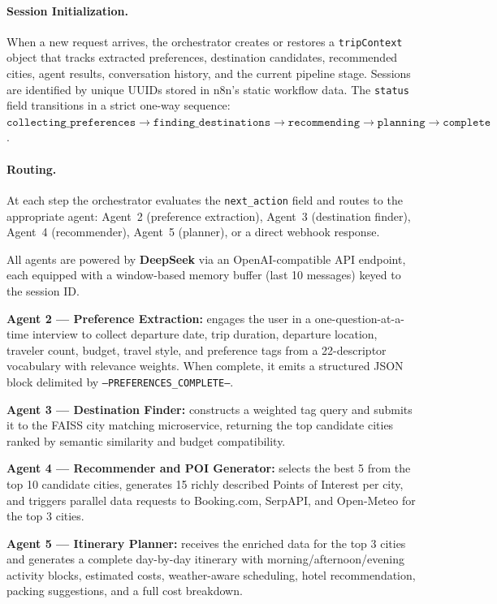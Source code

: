 \documentclass[12pt,a4paper]{report}
\begin{document}
\paragraph{Session Initialization.}
When a new request arrives, the orchestrator creates or restores a \texttt{tripContext} object that
tracks extracted preferences, destination candidates, recommended cities, agent results, conversation
history, and the current pipeline stage. Sessions are identified by unique UUIDs stored in n8n's
static workflow data. The \texttt{status} field transitions in a strict one-way sequence:
$\texttt{collecting\_preferences} \to \texttt{finding\_destinations} \to \texttt{recommending}
\to \texttt{planning} \to \texttt{complete}$.

\paragraph{Routing.}
At each step the orchestrator evaluates the \texttt{next\_action} field and routes to the
appropriate agent: Agent~2 (preference extraction), Agent~3 (destination finder), Agent~4
(recommender), Agent~5 (planner), or a direct webhook response.

All agents are powered by \textbf{DeepSeek} via an OpenAI-compatible API endpoint, each equipped
with a window-based memory buffer (last 10 messages) keyed to the session ID.

\textbf{Agent 2 — Preference Extraction:} engages the user in a one-question-at-a-time interview
to collect departure date, trip duration, departure location, traveler count, budget, travel style,
and preference tags from a 22-descriptor vocabulary with relevance weights. When complete, it emits
a structured JSON block delimited by \texttt{---PREFERENCES\_COMPLETE---}.

\textbf{Agent 3 — Destination Finder:} constructs a weighted tag query and submits it to the FAISS
city matching microservice, returning the top candidate cities ranked by semantic similarity and
budget compatibility.

\textbf{Agent 4 — Recommender and POI Generator:} selects the best 5 from the top 10 candidate
cities, generates 15 richly described Points of Interest per city, and triggers parallel data
requests to Booking.com, SerpAPI, and Open-Meteo for the top 3 cities.

\textbf{Agent 5 — Itinerary Planner:} receives the enriched data for the top 3 cities and generates
a complete day-by-day itinerary with morning/afternoon/evening activity blocks, estimated costs,
weather-aware scheduling, hotel recommendation, packing suggestions, and a full cost breakdown.
\end{document}
